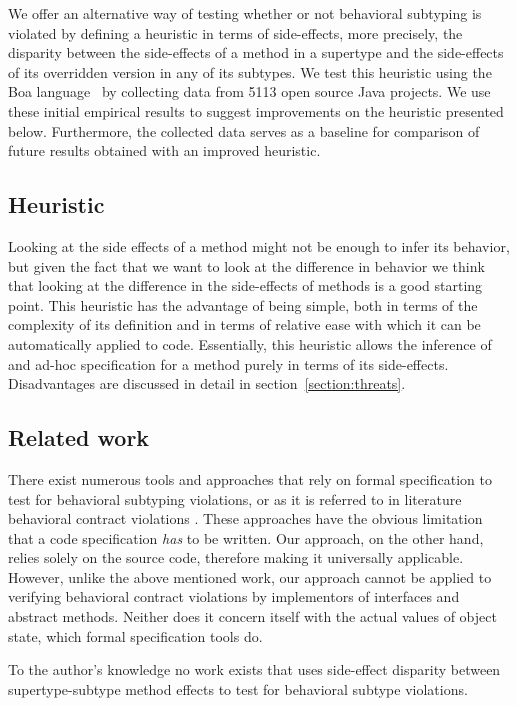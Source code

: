 \documentclass{acm_proc_article-sp}
\begin{document}
We offer an alternative way of testing whether or not behavioral subtyping is violated by defining a heuristic in terms of side-effects, more precisely, the disparity between the side-effects of a method in a supertype and the side-effects of its overridden version in any of its subtypes.
We test this heuristic using the Boa language~\cite{dyer2013boa:icse, dyer2013boa:gpce} by collecting data from 5113 open source Java projects. We use these initial empirical results to suggest improvements on the heuristic presented below. Furthermore, the collected data serves as a baseline for comparison of future results obtained with an improved heuristic.

\subsection{Heuristic}
Looking at the side effects of a method might not be enough to infer its behavior, but given the fact that we want to look at the difference in behavior we think that looking at the difference in the side-effects of methods is a good starting point.  This heuristic has the advantage of being simple, both in terms of the complexity of its definition and in terms of relative ease with which it can be automatically applied to code. Essentially, this heuristic allows the inference of and ad-hoc specification for a method purely in terms of its side-effects. Disadvantages are discussed in detail in section~\ref{section:threats}.

\subsection{Related work}
There exist numerous tools and approaches that rely on formal specification to test for behavioral subtyping violations, or as it is referred to in literature behavioral contract violations \cite{duncan1998adding, gomes1996language, karaorman1999jcontractor, kramer1998icontract, plosch1999contracts}. These approaches have the obvious limitation that a code specification \emph{has} to be written. Our approach, on the other hand, relies solely on the source code, therefore making it universally applicable. However, unlike the above mentioned work, our approach cannot be applied to verifying behavioral contract violations by implementors of interfaces and abstract methods. Neither does it concern itself with the actual values of object state, which formal specification tools do.

To the author's knowledge no work exists that uses side-effect disparity between supertype-subtype method effects to test for behavioral subtype violations.
\end{document}
